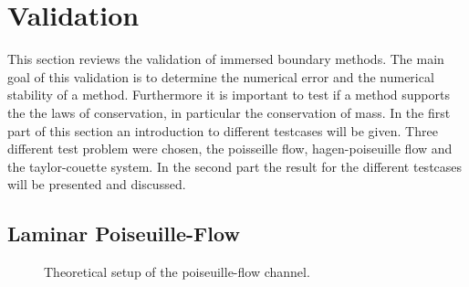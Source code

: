 \section{Validation}

This section reviews the validation of immersed boundary methods.
The main goal of this validation is to determine the numerical error and the
numerical stability of a method.
Furthermore it is important to test if a  method supports the
the laws of conservation, in particular the conservation of mass.
In the first part of this section an introduction to different testcases
will be given. Three different test problem were chosen,
the poisseille flow, hagen-poiseuille flow and the taylor-couette system.
In the second part the result for the different testcases will
be presented and discussed.



\subsection{Laminar Poiseuille-Flow}

\begin{figure}[!bp]
  \begin{minipage}[c]{0.6\textwidth}
      \centering
  \end{minipage}
  \begin{minipage}[c]{0.3\textwidth}
      \caption{Theoretical setup of the poiseuille-flow channel.
      \label{validation:setup_pf}
      }
  \end{minipage}
\end{figure}

\clearpage



